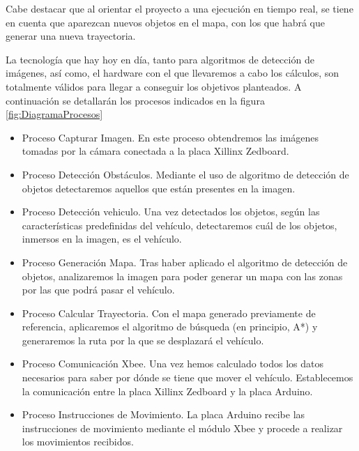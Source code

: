 \documentclass{pre-tfg}
\begin{document}



Cabe destacar que al orientar el proyecto a una ejecución en tiempo real, se tiene en cuenta que aparezcan nuevos objetos en el mapa, con los que habrá que generar una nueva trayectoria. 

La tecnología que hay hoy en día, tanto para algoritmos de detección de imágenes, así como, el hardware con el que llevaremos a cabo los cálculos, son totalmente válidos para llegar a conseguir los objetivos planteados. %
A continuación se detallarán los procesos indicados en la figura \ref{fig:DiagramaProcesos}


\begin{itemize}
\item Proceso Capturar Imagen. En este proceso obtendremos las imágenes tomadas por la cámara conectada a la placa Xillinx Zedboard.
\item Proceso Detección Obstáculos. Mediante el uso de algoritmo de detección de objetos detectaremos aquellos que están presentes en la imagen.
\item Proceso Detección vehiculo. Una vez detectados los objetos, según las características predefinidas del vehículo, detectaremos cuál de los objetos, inmersos en la imagen, es el vehículo.
\item Proceso Generación Mapa. Tras haber aplicado el algoritmo de detección de objetos, analizaremos la imagen para poder generar un mapa con las zonas por las que podrá pasar el vehículo.
\item Proceso Calcular Trayectoria. Con el mapa generado previamente de referencia, aplicaremos el algoritmo de búsqueda (en principio, A*) y generaremos la ruta por la que se desplazará el vehículo.
\item Proceso Comunicación Xbee. Una vez hemos calculado todos los datos necesarios para saber por dónde se tiene que mover el vehículo. Establecemos la comunicación entre la placa Xillinx Zedboard y la placa Arduino.
\item Proceso Instrucciones de Movimiento. La placa Arduino recibe las instrucciones de movimiento mediante el módulo Xbee y procede a realizar los movimientos recibidos.
\end{itemize}
\end{document}
